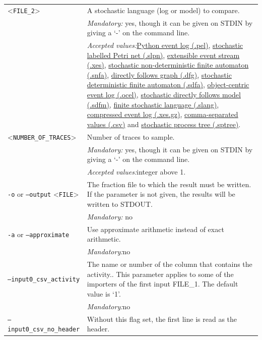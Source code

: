 {\begin{tabularx}{\linewidth}{lX}
<\texttt{FILE\_2}>&A stochastic language (log or model) to compare.\\
&\textit{Mandatory:} \quad yes, though it can be given on STDIN by giving a `-' on the command line.\\
&\textit{Accepted values:}\quad \hyperref[filehandler:Python event log]{Python event log (.pel)}, \hyperref[filehandler:stochastic labelled Petri net]{stochastic labelled Petri net (.slpn)}, \hyperref[filehandler:extensible event stream]{extensible event stream (.xes)}, \hyperref[filehandler:stochastic non-deterministic finite automaton]{stochastic non-deterministic finite automaton (.snfa)}, \hyperref[filehandler:directly follows graph]{directly follows graph (.dfg)}, \hyperref[filehandler:stochastic deterministic finite automaton]{stochastic deterministic finite automaton (.sdfa)}, \hyperref[filehandler:object-centric event log]{object-centric event log (.ocel)}, \hyperref[filehandler:stochastic directly follows model]{stochastic directly follows model (.sdfm)}, \hyperref[filehandler:finite stochastic language]{finite stochastic language (.slang)}, \hyperref[filehandler:compressed event log]{compressed event log (.xes.gz)}, \hyperref[filehandler:comma-separated values]{comma-separated values (.csv)} and \hyperref[filehandler:stochastic process tree]{stochastic process tree (.sptree)}.\\
<\texttt{NUMBER\_OF\_TRACES}>&Number of traces to sample.\\
&\textit{Mandatory:} \quad yes, though it can be given on STDIN by giving a `-' on the command line.\\
&\textit{Accepted values:}\quad integer above 1.\\
\texttt{-o} or \texttt{--output} <\texttt{FILE}> &
The fraction file to which the result must be written. If the parameter is not given, the results will be written to STDOUT.\\
&\textit{Mandatory:} \quad no\\
\texttt{-a} or \texttt{--approximate} & Use approximate arithmetic instead of exact arithmetic.\\
&\textit{Mandatory:}\quad no\\
\texttt{--input0\_csv\_activity} & The name or number of the column that contains the activity.. This parameter applies to some of the importers of the first input FILE\_1. The default value is `1'.\\
&\textit{Mandatory:}\quad no\\
\texttt{--input0\_csv\_no\_header} & Without this flag set, the first line is read as the header. 

\end{tabularx}}
